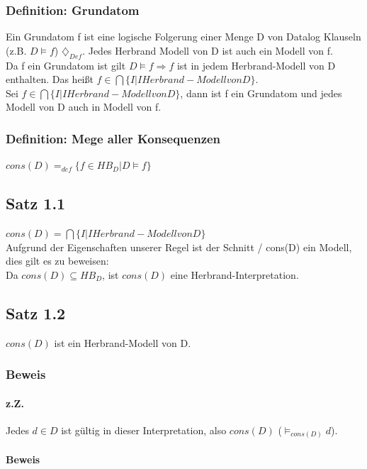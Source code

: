 \documentclass[12pt, a4paper]{article}
\begin{document}
\subsubsection*{Definition: Grundatom}
Ein Grundatom f ist eine logische Folgerung einer Menge D von Datalog Klauseln (z.B. $D \vDash f$) $\diamondsuit_{Def}$. Jedes Herbrand Modell von D ist auch ein Modell von f.\\
Da f ein Grundatom ist gilt $D \vDash f \Longrightarrow f $ ist in jedem Herbrand-Modell von D enthalten. Das heißt $f \in \bigcap \{ I | I Herbrand-Modell von D \}$.\\
Sei $f \in \bigcap \{ I | I Herbrand-Modell von D \}$, dann ist f ein Grundatom und jedes Modell von D auch in Modell von f. 

\subsubsection*{Definition: Mege aller Konsequenzen}

$cons(D) =_{def} \{ f \in HB_D | D \vDash f \}$


\subsection*{Satz 1.1}

$cons(D) = \bigcap \{ I | I Herbrand-Modell von D \}$ \\
Aufgrund der Eigenschaften unserer Regel ist der Schnitt / cons(D) ein Modell, dies gilt es zu beweisen: \\

Da $cons(D) \subseteq HB_D$, ist $cons(D)$ eine Herbrand-Interpretation.

\subsection*{Satz 1.2} 

$cons(D)$ ist ein Herbrand-Modell von D.

\subsubsection*{Beweis}
\paragraph*{z.Z.} 
Jedes $d \in D$ ist gültig in dieser Interpretation, also $cons(D)$ ($\vDash_{cons(D)} d$).

\paragraph*{Beweis}
\end{document}
